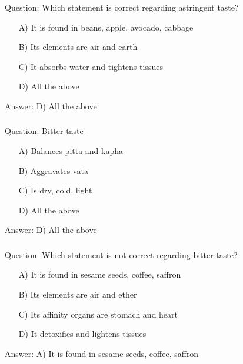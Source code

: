 \begin{frame}[fragile]\frametitle{}

Question: Which statement is correct regarding astringent taste?

\begin{itemize}
\item[A)] It is found in beans, apple, avocado, cabbage
\item[B)] Its elements are air and earth
\item[C)] It absorbs water and tightens tissues
\item[D)] All the above
\end{itemize}

Answer: D) All the above
\end{frame}

\begin{frame}[fragile]\frametitle{}

Question: Bitter taste-

\begin{itemize}
\item[A)] Balances pitta and kapha
\item[B)] Aggravates vata
\item[C)] Is dry, cold, light
\item[D)] All the above
\end{itemize}

Answer: D) All the above
\end{frame}

\begin{frame}[fragile]\frametitle{}

Question: Which statement is not correct regarding bitter taste?

\begin{itemize}
\item[A)] It is found in sesame seeds, coffee, saffron
\item[B)] Its elements are air and ether
\item[C)] Its affinity organs are stomach and heart
\item[D)] It detoxifies and lightens tissues
\end{itemize}

Answer: A) It is found in sesame seeds, coffee, saffron
\end{frame}

